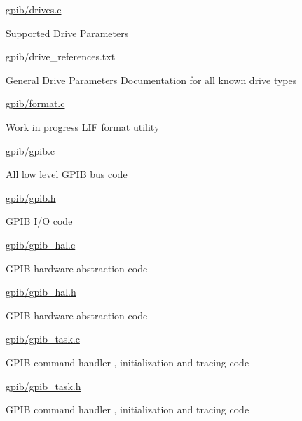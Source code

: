 \begin{DoxyItemize}
\begin{DoxyItemize}
\begin{DoxyItemize}
\end{DoxyItemize}
\item \hyperlink{drives_8c}{gpib/drives.\+c}
\begin{DoxyItemize}
\item Supported Drive Parameters
\end{DoxyItemize}
\item gpib/drive\+\_\+references.\+txt
\begin{DoxyItemize}
\item General Drive Parameters Documentation for all known drive types
\end{DoxyItemize}
\item \hyperlink{format_8c}{gpib/format.\+c}
\begin{DoxyItemize}
\item Work in progress L\+IF format utility
\end{DoxyItemize}
\item \hyperlink{gpib_8c}{gpib/gpib.\+c}
\begin{DoxyItemize}
\item All low level G\+P\+IB bus code
\end{DoxyItemize}
\item \hyperlink{gpib_8h}{gpib/gpib.\+h}
\begin{DoxyItemize}
\item G\+P\+IB I/O code
\end{DoxyItemize}
\item \hyperlink{gpib__hal_8c}{gpib/gpib\+\_\+hal.\+c}
\begin{DoxyItemize}
\item G\+P\+IB hardware abstraction code
\end{DoxyItemize}
\item \hyperlink{gpib__hal_8h}{gpib/gpib\+\_\+hal.\+h}
\begin{DoxyItemize}
\item G\+P\+IB hardware abstraction code
\end{DoxyItemize}
\item \hyperlink{gpib__task_8c}{gpib/gpib\+\_\+task.\+c}
\begin{DoxyItemize}
\item G\+P\+IB command handler , initialization and tracing code
\end{DoxyItemize}
\item \hyperlink{gpib__task_8h}{gpib/gpib\+\_\+task.\+h}
\begin{DoxyItemize}
\item G\+P\+IB command handler , initialization and tracing code

\end{DoxyItemize}
\end{DoxyItemize}
\end{DoxyItemize}
